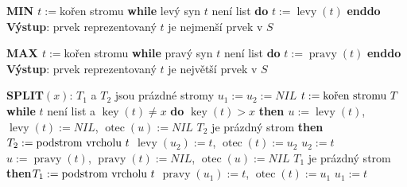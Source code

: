 \documentclass[a4paper,12pt]{article}
\DeclareMathOperator*{\otec}{otec}
\DeclareMathOperator*{\levy}{levy}
\DeclareMathOperator*{\pravy}{pravy}
\DeclareMathOperator*{\key}{key}
\begin{document}
{\bf MIN\newline 
$t:=$}kořen stromu\newline 
{\bf while} levý syn $t$ není list {\bf do} $t:=\levy(t)$ {\bf enddo\newline 
Výstup}: prvek reprezentovaný $t$ je nejmenší prvek v $
S$

{\bf MAX\newline 
$t:=$}kořen stromu\newline 
{\bf while} pravý syn $t$ není list {\bf do} $t:=\pravy(t)$ {\bf enddo\newline 
Výstup}: prvek reprezentovaný $t$ je největší prvek v $
S$

{\bf SPLIT$(x)$}:\newline 
$T_1$ a $T_2$ jsou prázdné stromy\newline 
$u_1:=u_2:=NIL$\newline 
$t:=\text{\rm kořen stromu }T$\newline 
{\bf while} $t$ není list a $\key(t)\ne x$ {\bf do\newline}
\phantom{---}{\bf if} $\key(t)>x$ {\bf then\newline 
\phantom{------}$u:=\levy(t)$}, $\levy(t):=NIL$, $\otec(u):=NIL$\newline 
\phantom{------}{\bf if} $T_2$ je prázdný strom {\bf then}\newline \phantom{---------}$T_2:=\text{\rm podstrom vrcholu }t$\newline
\phantom{------}{\bf else}\newline 
\phantom{---------}$\levy(u_2):=t$, $\otec(t):=u_2$\newline 
\phantom{------}{\bf endif}\newline
\phantom{------}$u_2:=t$\newline 
\phantom{---}{\bf else}\newline 
\phantom{------}$u:=\pravy(t)$, $\pravy(t):=NIL$, $\otec(u):=NIL$\newline
\phantom{------}{\bf if} $T_1$ je prázdný strom {\bf then}\newline \phantom{---------}$T_1:=\text{\rm podstrom vrcholu }t$\newline
\phantom{------}{\bf else}\newline 
\phantom{---------}$\pravy(u_1):=t$, $\otec(t):=u_1$\newline 
\phantom{------}{\bf endif}\newline
\phantom{------}$u_1:=t$\newline 
\phantom{---}{\bf endif}\newline 
\end{document}
